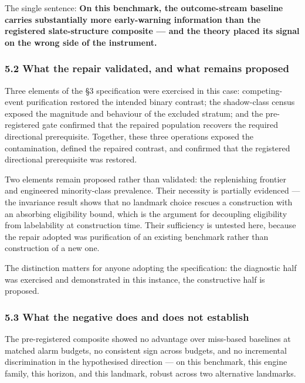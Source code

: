 \documentclass[
  11pt,
]{article}
\begin{document}
The single sentence: \textbf{On this benchmark, the outcome-stream
baseline carries substantially more early-warning information than the
registered slate-structure composite --- and the theory placed its
signal on the wrong side of the instrument.}

\subsubsection{5.2 What the repair validated, and what remains
proposed}\label{what-the-repair-validated-and-what-remains-proposed}

Three elements of the §3 specification were exercised in this case:
competing-event purification restored the intended binary contrast; the
shadow-class census exposed the magnitude and behaviour of the excluded
stratum; and the pre-registered gate confirmed that the repaired
population recovers the required directional prerequisite. Together,
these three operations exposed the contamination, defined the repaired
contrast, and confirmed that the registered directional prerequisite was
restored.

Two elements remain proposed rather than validated: the replenishing
frontier and engineered minority-class prevalence. Their necessity is
partially evidenced --- the invariance result shows that no landmark
choice rescues a construction with an absorbing eligibility bound, which
is the argument for decoupling eligibility from labelability at
construction time. Their sufficiency is untested here, because the
repair adopted was purification of an existing benchmark rather than
construction of a new one.

The distinction matters for anyone adopting the specification: the
diagnostic half was exercised and demonstrated in this instance, the
constructive half is proposed.

\subsubsection{5.3 What the negative does and does not
establish}\label{what-the-negative-does-and-does-not-establish}

The pre-registered composite showed no advantage over miss-based
baselines at matched alarm budgets, no consistent sign across budgets,
and no incremental discrimination in the hypothesised direction --- on
this benchmark, this engine family, this horizon, and this landmark,
robust across two alternative landmarks.
\end{document}
